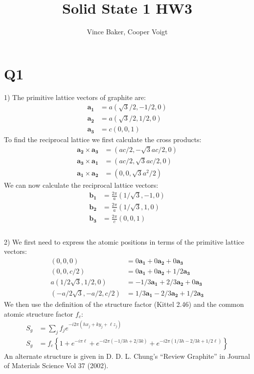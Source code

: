 \documentclass[a4paper,11pt]{article}
\title{Solid State 1 HW3}
\author{Vince Baker, Cooper Voigt}
\numberwithin{equation}{section}
\newcommand{\bv}[1]{\mathbf{#1}}
\newcommand{\lrb}[1]{\left\{{#1}\right\}}
\begin{document}
\maketitle

\section*{Q1}
1) The primitive lattice vectors of graphite are:
\begin{align}
 \bv{a_1} &= a(\sqrt{3}/2, -1/2, 0)\\
 \bv{a_2} &= a(\sqrt{3}/2, 1/2, 0)\\
 \bv{a_3} &= c(0, 0, 1)
\end{align}
To find the reciprocal lattice we first calculate the cross products:
\begin{align}
 \bv{a_2} \times \bv{a_3} &= (ac/2, -\sqrt{3}ac/2, 0)\\
 \bv{a_3} \times \bv{a_1} &= (ac/2, \sqrt{3}ac/2, 0)\\
 \bv{a_1} \times \bv{a_2} &= (0, 0, \sqrt{3}a^2/2)
\end{align}
We can now calculate the reciprocal lattice vectors:
\begin{align}
 \bv{b_1} &= \frac{2\pi}{a}(1/\sqrt{3},-1 , 0)\\
 \bv{b_2} &= \frac{2\pi}{a}(1/\sqrt{3}, 1 , 0)\\
 \bv{b_3} &= \frac{2\pi}{c}(0, 0 , 1)\\
\end{align}
\\
2) We first need to express the atomic positions in terms of the primitive lattice vectors:
\begin{align}
 (0,0,0) &= 0\bv{a_1}+0\bv{a_2}+0\bv{a_3}\\
 (0,0,c/2) &= 0\bv{a_1}+0\bv{a_2}+1/2\bv{a_3}\\
 a(1/2\sqrt{3},1/2,0) &= -1/3\bv{a_1}+2/3\bv{a_2}+0\bv{a_3}\\
  (-a/2\sqrt{3},-a/2,c/2) &= 1/3\bv{a_1}-2/3\bv{a_2}+1/2\bv{a_3}
\end{align}
We then use the definition of the structure factor (Kittel 2.46) and the common atomic structure factor $f_c$:
\begin{align}
 S_g &= \sum_j f_je^{-i2\pi(hx_j+ky_j+\ell z_j)}\\
 S_g &= f_c\lrb{ 1 + e^{-i\pi\ell}+e^{-i2\pi(-1/3h+2/3k)}+e^{-i2\pi(1/3h-2/3k+1/2\ell)} }
\end{align}
An alternate structure is given in D. D. L. Chung's ``Review Graphite'' in Journal of Materials Science Vol 37 (2002).
\end{document}
